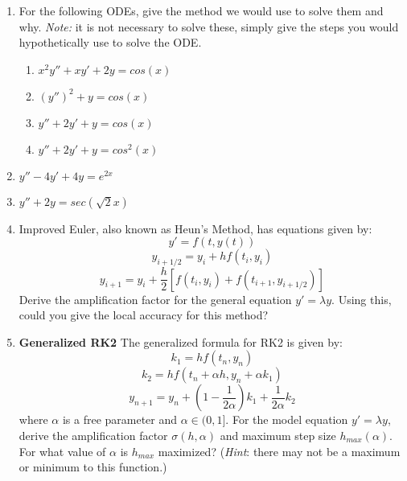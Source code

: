 \documentclass[letterpaper, fontsize=11pt]{scrartcl} %
\numberwithin{equation}{section} %
\numberwithin{figure}{section} %
\numberwithin{table}{section} %
\begin{document}
\begin{enumerate}
\item For the following ODEs, give the method we would use to solve them and why. \textit{Note:} it is not necessary to solve these, simply give the steps you would hypothetically use to solve the ODE. 
\begin{enumerate}
\item $x^2 y'' + xy' + 2y = cos(x)$ \par

\item $(y'')^2 + y = cos(x)$\par 

\item $y'' + 2y' + y = cos(x)$ \par

\item $y'' + 2y' + y = cos^2(x)$ \par

\end{enumerate}
\item $y'' - 4y' +4y = e^{2x}$ 

\item $y'' + 2y = sec(\sqrt{2}x)$ 


\item Improved Euler, also known as Heun's Method, has equations given by: 
$$y' = f(t, y(t))$$
$$y_{i+1/2} = y_i + hf(t_i,y_i)$$
$$y_{i+1} = y_i + \frac{h}{2}[f(t_i,y_i) + f(t_{i+1},y_{i+1/2})]$$ 
Derive the amplification factor for the general equation $y' = \lambda y$. Using this, could you give the local accuracy for this method?

\item \textbf{Generalized RK2} The generalized formula for RK2 is given by:
$$k_1 = hf(t_n,y_n)$$
$$k_2 = hf(t_n + \alpha h, y_n + \alpha k_1)$$
$$y_{n+1} = y_n + (1 - \frac{1}{2\alpha})k_1 + \frac{1}{2\alpha}k_2$$
where $\alpha$ is a free parameter and $\alpha \in (0,1]$. For the model equation $y' = \lambda y$, derive the amplification factor $\sigma (h,\alpha)$ and maximum step size $h_{max} (\alpha)$. For what value of $\alpha$ is $h_{max}$ maximized? (\textit{Hint}: there may not be a maximum or minimum to this function.) 
\end{enumerate}

\end{document}
